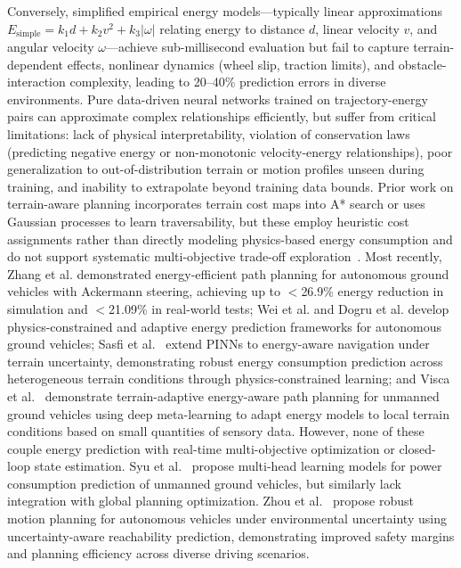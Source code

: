 \documentclass[pdflatex,sn-nature]{sn-jnl}%
\begin{document}
Conversely, simplified empirical energy models\cite{Sun2015}—typically linear approximations $E_{\text{simple}} = k_1 d + k_2 v^2 + k_3 |\omega|$ relating energy to distance $d$, linear velocity $v$, and angular velocity $\omega$—achieve sub-millisecond evaluation but fail to capture terrain-dependent effects, nonlinear dynamics (wheel slip, traction limits), and obstacle-interaction complexity, leading to 20--40\% prediction errors in diverse environments. Pure data-driven neural networks trained on trajectory-energy pairs can approximate complex relationships efficiently, but suffer from critical limitations: lack of physical interpretability, violation of conservation laws (predicting negative energy or non-monotonic velocity-energy relationships), poor generalization to out-of-distribution terrain or motion profiles unseen during training, and inability to extrapolate beyond training data bounds. Prior work on terrain-aware planning incorporates terrain cost maps into A* search or uses Gaussian processes to learn traversability, but these employ heuristic cost assignments rather than directly modeling physics-based energy consumption and do not support systematic multi-objective trade-off exploration~\cite{Liu2024gp}. Most recently, Zhang et al.\cite{Zhang2023} demonstrated energy-efficient path planning for autonomous ground vehicles with Ackermann steering, achieving up to $<$26.9\% energy reduction in simulation and $<$21.09\% in real-world tests; Wei et al.\cite{Wei2022energy} and Dogru et al.\cite{Dogru2022ecot} develop physics-constrained and adaptive energy prediction frameworks for autonomous ground vehicles; Sasfi et al.~\cite{Sasfi2023pinn} extend PINNs to energy-aware navigation under terrain uncertainty, demonstrating robust energy consumption prediction across heterogeneous terrain conditions through physics-constrained learning; and Visca et al.~\cite{Visca2022deep} demonstrate terrain-adaptive energy-aware path planning for unmanned ground vehicles using deep meta-learning to adapt energy models to local terrain conditions based on small quantities of sensory data. However, none of these couple energy prediction with real-time multi-objective optimization or closed-loop state estimation. Syu et al.~\cite{Syu2025multi} propose multi-head learning models for power consumption prediction of unmanned ground vehicles, but similarly lack integration with global planning optimization. Zhou et al.~\cite{Zhou2025robust} propose robust motion planning for autonomous vehicles under environmental uncertainty using uncertainty-aware reachability prediction, demonstrating improved safety margins and planning efficiency across diverse driving scenarios.
\end{document}
